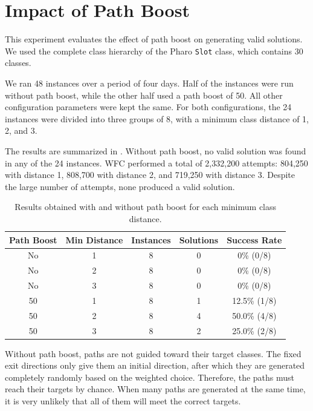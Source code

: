 \documentclass[../../main.tex]{subfiles}
\begin{document}
\section{Impact of Path Boost}
\label{sec:path_boost_effect}
This experiment evaluates the effect of path boost on generating valid solutions. We used the complete class hierarchy of the Pharo \texttt{Slot} class, which contains 30 classes.

We ran 48 instances over a period of four days. Half of the instances were run without path boost, while the other half used a path boost of 50. All other configuration parameters were kept the same. For both configurations, the 24 instances were divided into three groups of 8, with a minimum class distance of 1, 2, and 3.

The results are summarized in . Without path boost, no valid solution was found in any of the 24 instances. WFC performed a total of 2,332,200 attempts: 804,250 with distance 1, 808,700 with distance 2, and 719,250 with distance 3. Despite the large number of attempts, none produced a valid solution.

\begin{table}[ht]
    \centering
    \begin{tabular}{ccccc}
        \textbf{Path Boost} & \textbf{Min Distance} & \textbf{Instances} & \textbf{Solutions} & \textbf{Success Rate} \\
        \hline
        No & 1 & 8 & 0 & 0\% (0/8) \\
        No & 2 & 8 & 0 & 0\% (0/8) \\
        No & 3 & 8 & 0 & 0\% (0/8) \\
        50 & 1 & 8 & 1 & 12.5\% (1/8) \\
        50 & 2 & 8 & 4 & 50.0\% (4/8) \\
        50 & 3 & 8 & 2 & 25.0\% (2/8) \\
        \hline
    \end{tabular}
    \caption{Results obtained with and without path boost for each minimum class distance.}
    \label{tab:path_boost_results}
\end{table}

Without path boost, paths are not guided toward their target classes. The fixed exit directions only give them an initial direction, after which they are generated completely randomly based on the weighted choice. Therefore, the paths must reach their targets by chance. When many paths are generated at the same time, it is very unlikely that all of them will meet the correct targets.
\end{document}

